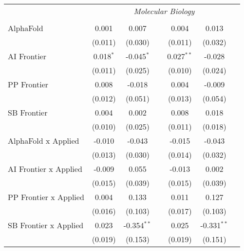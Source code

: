 \begin{tabular}{lcccccc}
 & \multicolumn{6}{c}{\textit{Molecular Biology}} \\ \\
   AlphaFold                      & 0.001       & 0.007         &                & 0.004        & 0.013         &   \\   
                                  & (0.011)     & (0.030)       &                & (0.011)      & (0.032)       &   \\   
   AI Frontier                    & 0.018$^{*}$ & -0.045$^{*}$  &                & 0.027$^{**}$ & -0.028        &   \\   
                                  & (0.011)     & (0.025)       &                & (0.010)      & (0.024)       &   \\   
   PP Frontier                    & 0.008       & -0.018        &                & 0.004        & -0.009        &   \\   
                                  & (0.012)     & (0.051)       &                & (0.013)      & (0.054)       &   \\   
   SB Frontier                    & 0.004       & 0.002         &                & 0.008        & 0.018         &   \\   
                                  & (0.010)     & (0.025)       &                & (0.011)      & (0.018)       &   \\   
   AlphaFold x Applied            & -0.010      & -0.043        &                & -0.015       & -0.043        &   \\   
                                  & (0.013)     & (0.030)       &                & (0.014)      & (0.032)       &   \\   
   AI Frontier x Applied          & -0.009      & 0.055         &                & -0.013       & 0.002         &   \\   
                                  & (0.015)     & (0.039)       &                & (0.015)      & (0.039)       &   \\   
   PP Frontier x Applied          & 0.004       & 0.133         &                & 0.011        & 0.127         &   \\   
                                  & (0.016)     & (0.103)       &                & (0.017)      & (0.103)       &   \\   
   SB Frontier x Applied          & 0.023       & -0.354$^{**}$ &                & 0.025        & -0.331$^{**}$ &   \\   
                                  & (0.019)     & (0.153)       &                & (0.019)      & (0.151)       &   \\   

\end{tabular}
